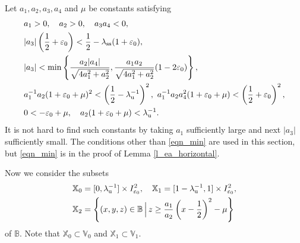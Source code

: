 \documentclass{amsart}
\theoremstyle{plain}
\theoremstyle{definition}
\theoremstyle{remark}
\numberwithin{equation}{section}
\begin{document}
Let $a_{1},a_{2},a_{3},a_{4}$ and $\mu$ be constants 
satisfying  
\begin{subequations}
\begin{align}
&a_{1}>0,\quad a_2>0,\quad a_3a_4<0,\label{eqn_aaa}\\
&|a_{3}|\left(\frac12+\varepsilon_0\right)<\frac12-\lambda_{\rm ss}(1+\varepsilon_0),\label{eqn_|a3|}\\
&|a_3|<\min\left\{\dfrac{a_2|a_4|}{\sqrt{4a_1^2+a_2^2}},\dfrac{a_1a_2}{\sqrt{4a_1^2+a_2^2}}(1-2\varepsilon_0)\right\},\label{eqn_min}\\
&a_1^{-1}a_2(1+\varepsilon_0+\mu)^2<\left(\frac12-\lambda_{\rm u}^{-1}\right)^2,\  
a_1^{-1}a_2a_4^2(1+\varepsilon_0+\mu)<\left(\frac12+\varepsilon_0\right)^2,\label{eqn_a42}\\
&0<-\varepsilon_0+\mu,\quad a_2(1+\varepsilon_0+\mu)<\lambda_{\rm u}^{-1}.\label{eqn_e_0mu}
\end{align}
\end{subequations}
It is not hard to find such constants by taking $a_1$ sufficiently large and next $|a_3|$ sufficiently small.
The conditions other than \eqref{eqn_min} are used in this section, but 
\eqref{eqn_min} is in the proof of Lemma \ref{l_ea_horizontal}.

Now we consider the subsets 
\begin{align*}
\mathbb{X}_{0}&= [0, \lambda_{\rm u}^{-1}]\times I_{\varepsilon_{0}}^{2},\quad 
\mathbb{X}_{1}= [1-\lambda_{\rm u}^{-1},1]\times I_{\varepsilon_{0}}^{2},\\
\mathbb{X}_2&=\left\{(x,y,z)\in \mathbb{B}\,\Big|\,z\geq \frac{a_1}{a_2}\left(x-\frac12\right)^2-\mu\right\}
\end{align*}
of $\mathbb{B}$.
Note that $\mathbb{X}_{0}\subset \mathbb{V}_{0}$ and $\mathbb{X}_{1}\subset \mathbb{V}_{1}$.
\end{document}
